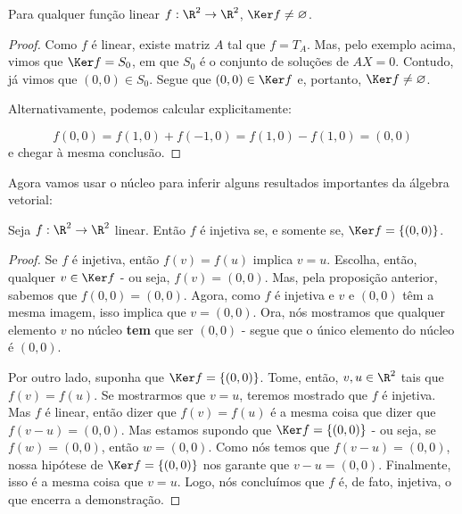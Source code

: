 \begin{prop}
	Para qualquer função linear $f:\R^2\to\R^2$, $\Ker f\neq \varnothing$.
\end{prop}
\begin{proof}
	Como $f$ é linear, existe matriz $A$ tal que $f=T_A$. Mas, pelo exemplo acima, vimos que $\Ker f= S_0$, em que $S_0$ é o conjunto de soluções de $AX=0$. Contudo, já vimos que $(0,0)\in S_0$. Segue que $(0,0)\in \Ker f$ e, portanto, $\Ker f\neq\varnothing$.
	
	
	Alternativamente, podemos calcular explicitamente:
	
	\[f(0,0)=f(1,0)+f(-1,0)=f(1,0)-f(1,0)=(0,0)\]e chegar à mesma conclusão.
\end{proof}

Agora vamos usar o núcleo para inferir alguns resultados importantes da álgebra vetorial:

\begin{prop}
	Seja $f:\R^2\to\R^2$ linear. Então $f$ é injetiva se, e somente se, $\Ker f=\{(0,0)\}$.
\end{prop}

\begin{proof}
	Se $f$ é injetiva, então $f(v)=f(u)$ implica $v=u$. Escolha, então, qualquer $v\in \Ker f$ - ou seja, $f(v)=(0,0)$. Mas, pela proposição anterior, sabemos que $f(0,0)=(0,0)$. Agora, como $f$ é injetiva e $v$ e $(0,0)$ têm a mesma imagem, isso implica que $v=(0,0)$. Ora, nós mostramos que qualquer elemento $v$ no núcleo \textbf{tem} que ser $(0,0)$ - segue que o único elemento do núcleo é $(0,0)$.
	
	Por outro lado, suponha que $\Ker f=\{(0,0)\}$. Tome, então, $v,u\in\R^2$ tais que $f(v)=f(u)$. Se mostrarmos que $v=u$, teremos mostrado que $f$ é injetiva. Mas $f$ é linear, então dizer que $f(v)=f(u)$ é a mesma coisa que dizer que $f(v-u)=(0,0)$. Mas estamos supondo que $\Ker f=\{(0,0)\}$ - ou seja, se $f(w)=(0,0)$, então $w=(0,0)$. Como nós temos que $f(v-u)=(0,0)$, nossa hipótese de $\Ker f=\{(0,0)\}$ nos garante que $v-u=(0,0)$. Finalmente, isso é a mesma coisa que $v=u$. Logo, nós concluímos que $f$ é, de fato, injetiva, o que encerra a demonstração.
\end{proof}

